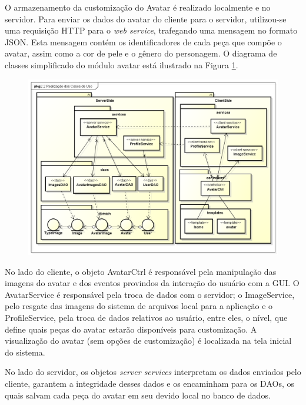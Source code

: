 O armazenamento da customização do Avatar é realizado localmente e no servidor. Para enviar os dados do avatar do cliente para o servidor, utilizou-se uma requisição HTTP para o \textit{web service}, trafegando uma mensagem no formato JSON. Esta mensagem contém os identificadores de cada peça que compõe o avatar, assim como a cor de pele e o gênero do personagem. O diagrama de classes simplificado do módulo avatar está ilustrado na Figura \ref{fig:avatarClasses}. 
\begin{figure}[h]
\begin{minipage}{1.0\textwidth}
    \centerline{\includegraphics[width=33em]{figuras/avatarClasses.png}}
    \label{fig:avatarClasses}
\end{minipage}
\end{figure}

No lado do cliente, o objeto AvatarCtrl é responsável pela manipulação das imagens do avatar e dos eventos provindos da interação do usuário com a GUI. O AvatarService é responsável pela troca de dados com o servidor; o ImageService, pelo resgate das imagens do sistema de arquivos local para a aplicação e o ProfileService, pela troca de dados relativos ao usuário, entre eles, o nível, que define quais peças do avatar estarão disponíveis para customização. A visualização do avatar (sem opções de customização) é localizada na tela inicial do sistema.
\par
No lado do servidor, os objetos \textit{server services} interpretam os dados enviados pelo cliente, garantem a integridade desses dados e os encaminham para os DAOs, os quais salvam cada peça do avatar em seu devido local no banco de dados. 

